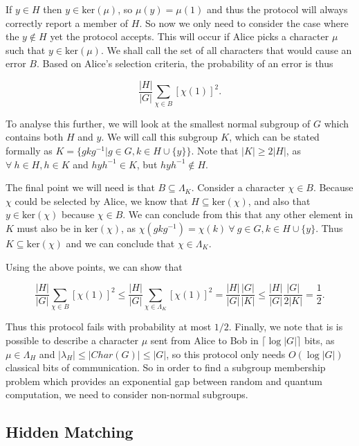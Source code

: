 \documentclass[a4paper]{article}
\begin{document}
        If $y \in H$ then $y \in \textrm{ker}(\mu)$, so $\mu(y) = \mu(1)$ and thus the protocol will always correctly report a member of $H$. So now we only need to consider the case where the $y \notin H$ yet the protocol accepts. This will occur if Alice picks a character $\mu$ such that $y \in \textrm{ker}(\mu)$. We shall call the set of all characters that would cause an error $B$. Based on Alice's selection criteria, the probability of an error is thus

        $$\frac{|H|}{|G|}\sum_{\chi \in B}[\chi(1)]^2.$$

        To analyse this further, we will look at the smallest normal subgroup of $G$ which contains both $H$ and $y$. We will call this subgroup $K$, which can be stated formally as $K = \{gkg^{-1}|g \in G, k \in H \cup \{y\}\}$. Note that $|K| \geq 2|H|$, as $\forall~h\in H, h \in K$ and $hyh^{-1} \in K$, but $hyh^{-1} \notin H$.

        The final point we will need is that $B \subseteq \Lambda_K$. Consider a character $\chi \in B$. Because $\chi$ could be selected by Alice, we know that $H \subseteq \textrm{ker}(\chi)$, and also that $y \in \textrm{ker}(\chi)$ because $\chi \in B$. We can conclude from this that any other element in $K$ must also be in $\textrm{ker}(\chi)$, as $\chi(gkg^{-1}) = \chi(k)~\forall~g\in G, k\in H \cup \{y\}$. Thus $K \subseteq \textrm{ker}(\chi)$ and we can conclude that $\chi \in \Lambda_K$.

        Using the above points, we can show that

        $$\frac{|H|}{|G|}\sum_{\chi \in B}[\chi(1)]^2 \leq \frac{|H|}{|G|}\sum_{\chi \in \Lambda_K}[\chi(1)]^2 = \frac{|H|}{|G|}\frac{|G|}{|K|} \leq \frac{|H|}{|G|}\frac{|G|}{2|K|} = \frac{1}{2}.$$

        Thus this protocol fails with probability at most $1/2$. Finally, we note that is is possible to describe a character $\mu$ sent from Alice to Bob in $\lceil\log|G|\rceil$ bits, as $\mu \in \Lambda_H$ and $|\lambda_H| \leq |Char(G)| \leq |G|$, so this protocol only needs $O(\log |G|)$ classical bits of communication. So in order to find a subgroup membership problem which provides an exponential gap between random and quantum computation, we need to consider non-normal subgroups.

        \subsection{Hidden Matching}
        \label{sec:hidden-matching}
\end{document}
